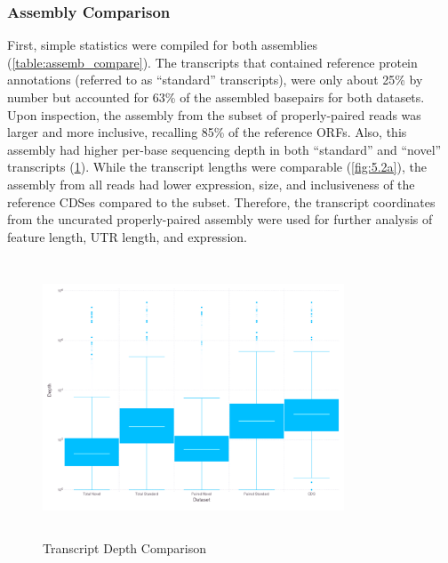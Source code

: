 \subsubsection{Assembly Comparison}
First, simple statistics were compiled for both assemblies (\ref{table:assemb_compare}). The transcripts that contained reference protein annotations (referred to as ``standard'' transcripts), were only about 25\% by number but accounted for 63\% of the assembled basepairs for both datasets. Upon inspection, the assembly from the subset of properly-paired reads was larger and more inclusive, recalling 85\% of the reference ORFs. Also, this assembly had higher per-base sequencing depth in both ``standard'' and ``novel'' transcripts (\ref{fig:5.1}). While the transcript lengths were comparable (\ref{fig:5.2a}), the assembly from all reads had lower expression, size, and inclusiveness of the reference CDSes compared to the subset. Therefore, the transcript coordinates from the uncurated properly-paired assembly were used for further analysis of feature length, UTR length, and expression.




\begin{figure}
\small
\begin{center}
\includegraphics[width=0.8\textwidth,height=3.25in]{images/Assembly/Comparison/PairvsTot_boxplot.png}
\end{center}
\caption{Transcript Depth Comparison}\label{fig:5.1}
\end{figure}


